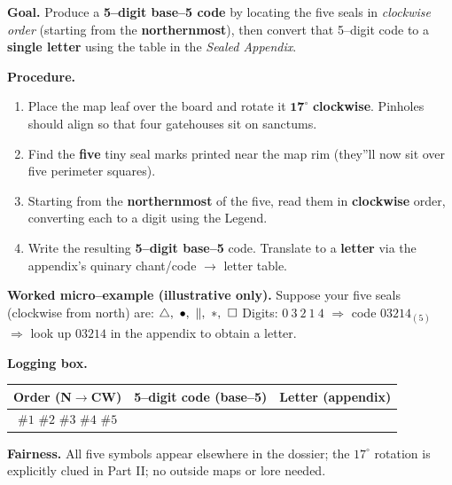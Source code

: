 \documentclass[11pt]{article}
\numberwithin{equation}{section} %
\theoremstyle{plain} %
\theoremstyle{definition} %
\theoremstyle{remark} %
\begin{document}
\medskip
\noindent\textbf{Goal.} Produce a \textbf{5--digit base--5 code} by locating the five seals in \emph{clockwise order} (starting from the \textbf{northernmost}), then convert that 5--digit code to a \textbf{single letter} using the table in the \emph{Sealed Appendix}.

\medskip
\noindent\textbf{Procedure.}
\begin{enumerate}\setlength\itemsep{0.2em}
  \item Place the map leaf over the board and rotate it \(\mathbf{17^\circ}\) \textbf{clockwise}. Pinholes should align so that four gatehouses sit on sanctums.
  \item Find the \textbf{five} tiny seal marks printed near the map rim (they''ll now sit over five perimeter squares).
  \item Starting from the \textbf{northernmost} of the five, read them in \textbf{clockwise} order, converting each to a digit using the Legend.
  \item Write the resulting \textbf{5--digit base--5} code. Translate to a \textbf{letter} via the appendix's quinary chant/code \(\rightarrow\) letter table.
\end{enumerate}

\medskip
\noindent\textbf{Worked micro--example (illustrative only).}  
Suppose your five seals (clockwise from north) are: \(\triangle,\ \bullet,\ \Vert,\ \large\ast,\ \square\)  
Digits: \(0\ 3\ 2\ 1\ 4\) \(\Rightarrow\) code \(03214_{(5)}\) \(\Rightarrow\) look up \(03214\) in the appendix to obtain a letter.

\medskip
\noindent\textbf{Logging box.}
\begin{center}
\begin{tabular}{c|c|c}
\textbf{Order (N\(\rightarrow\)CW)} & \textbf{5--digit code (base--5)} & \textbf{Letter (appendix)} \\
\hline
\(\#1\) \(\#2\) \(\#3\) \(\#4\) \(\#5\) & \hspace{3.5cm} & \hspace{1.2cm} \\
\end{tabular}
\end{center}

\medskip
\noindent\textbf{Fairness.} All five symbols appear elsewhere in the dossier; the \(17^\circ\) rotation is explicitly clued in Part II; no outside maps or lore needed.
\end{document}
